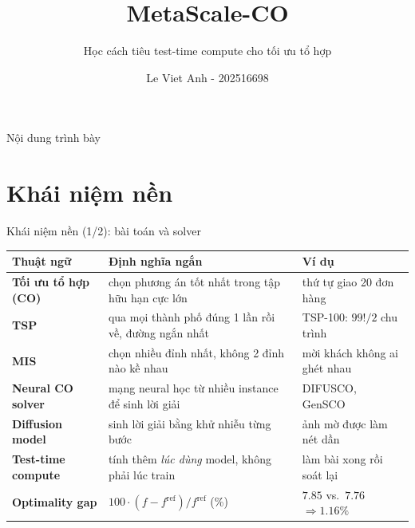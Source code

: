 \documentclass[t, aspectratio=169]{beamer}
\title{MetaScale-CO}
\subtitle{Học cách tiêu test-time compute cho tối ưu tổ hợp}
\author{\texorpdfstring{Le Viet Anh - 202516698}{Le Viet Anh - 202516698}}
\institute{}
\begin{document}
	\hustintropage{}
	\husttitlepage

	\begin{frame}{Nội dung trình bày}
		\vspace*{-6mm}\small\tableofcontents[hideallsubsections]
	\end{frame}

	\resetPageCount
	\showPageNumber
	\useStyleHustFull
	\useThinBar

	\section{Khái niệm nền}

	\begin{frame}{Khái niệm nền (1/2): bài toán và solver}
		\centering\footnotesize
		\renewcommand{\arraystretch}{1.12}
		\begin{tabular}{@{}>{\raggedright\arraybackslash\leavevmode\color{hustprimary}\bfseries}p{}>{\raggedright\arraybackslash}p{}>{\raggedright\arraybackslash}p{}@{}}
			\toprule
			\color{black}Thuật ngữ & \textbf{Định nghĩa ngắn} & \textbf{Ví dụ} \\
			\midrule
			Tối ưu tổ hợp (CO) & chọn phương án tốt nhất trong tập hữu hạn cực lớn & thứ tự giao 20 đơn hàng \\
			TSP & qua mọi thành phố đúng 1 lần rồi về, đường ngắn nhất & TSP-100: $99!/2$ chu trình \\
			MIS & chọn nhiều đỉnh nhất, không 2 đỉnh nào kề nhau & mời khách không ai ghét nhau \\
			Neural CO solver & mạng neural học từ nhiều instance để sinh lời giải & DIFUSCO, GenSCO \\
			Diffusion model & sinh lời giải bằng khử nhiễu từng bước & ảnh mờ được làm nét dần \\
			Test-time compute & tính thêm \emph{lúc dùng} model, không phải lúc train & làm bài xong rồi soát lại \\
			Optimality gap & $100\cdot(f-f^{\mathrm{ref}})/f^{\mathrm{ref}}$ (\%) & $7.85$ vs.\ $7.76$ $\Rightarrow1.16\%$ \\
			\bottomrule
		\end{tabular}
	\end{frame}
\end{document}
